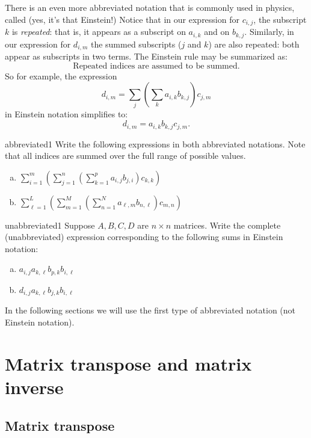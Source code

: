 There is an even more abbreviated notation that is commonly used in physics, called   (yes, it's that Einstein!) Notice that in our expression for ${c}_{i,j}$, the subscript $k$ is \emph{repeated}: that is, it appears as a subscript on $a_{i,k}$ and on  $b_{k,j}$. Similarly, in our expression for ${d}_{i,m}$  the summed subscripts ($j$ and $k$) are also repeated: both appear as subscripts in two terms. The Einstein rule may be summarized as:
\[ \text{Repeated indices are assumed to be summed.} \] 
So for example, the expression
\[ {d}_{i,m}= \sum_{j} \left( \sum_{k} a_{i,k} b_{k,j} \right) c_{j,m} \]
in  Einstein notation simplifies to:
\[ {d}_{i,m}=  a_{i,k} b_{k,j} c_{j,m}. \]

\begin{exercise}{abbreviated1}
Write the following expressions in both abbreviated notations. Note that all indices are summed over the full range of possible values.
\begin{enumerate}[(a)]
\item
$\sum_{i=1}^m \left( \sum_{j=1}^n \left( \sum_{k=1}^p  a_{i,j} b_{j,i} \right) c_{k,k}\right)$
\item
$\sum_{\ell=1}^L \left( \sum_{m=1}^M \left( \sum_{n=1}^N  a_{\ell,m} b_{n,\ell} \right) c_{m,n} \right)$
\end{enumerate}
\end{exercise}

\begin{exercise}{unabbreviated1}
Suppose $A,B,C,D$ are $n \times n$ matrices.  Write the complete (unabbreviated) expression corresponding to the following sums in Einstein notation:
\begin{enumerate}[(a)]
\item
$a_{i,j}a_{k,\ell}b_{p,k}b_{i,\ell}$
\item
$d_{i,j}a_{k,\ell}b_{j,k}b_{i,\ell}$
\end{enumerate}
\end{exercise}

In the following sections we will use the first type of abbreviated notation (not Einstein notation).


\section{Matrix transpose and matrix inverse}
\label{sec:SigmaApp:MatrixTransposeInverses}

\subsection{Matrix transpose}
\label{subsec:SigmaApp:MatrixTransposeInverses:MatrixTranspose}

